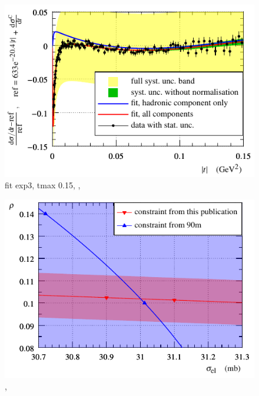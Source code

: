 \egroup

\begin{figure}
\vskip-5mm
\begin{center}
\includegraphics{fig/fit_details_exp3_0p15.pdf}
\caption{%
fit exp3, tmax 0.15,
,
}
\label{fig:fit exp3 0.15}
\end{center}
\end{figure}


\begin{figure}
\vskip-5mm
\begin{center}
\includegraphics{fig/si_el_rho_solution.pdf}
\caption{%
,
}
\label{fig:si_el rho sol}
\end{center}
\end{figure}





